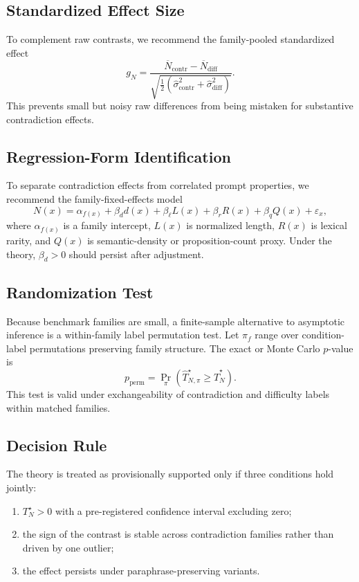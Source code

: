 \documentclass{svjour3}
\begin{document}
\subsection{Standardized Effect Size}
To complement raw contrasts, we recommend the family-pooled standardized effect
\[
g_N=\frac{\overline{N}_{\text{contr}}-\overline{N}_{\text{diff}}}
{\sqrt{\tfrac{1}{2}\left(\widehat{\sigma}_{\text{contr}}^2+\widehat{\sigma}_{\text{diff}}^2\right)}}.
\]
This prevents small but noisy raw differences from being mistaken for substantive contradiction effects.

\subsection{Regression-Form Identification}
To separate contradiction effects from correlated prompt properties, we recommend the family-fixed-effects model
\[
N(x)=\alpha_{f(x)}+\beta_d d(x)+\beta_\ell L(x)+\beta_r R(x)+\beta_q Q(x)+\varepsilon_x,
\]
where $\alpha_{f(x)}$ is a family intercept, $L(x)$ is normalized length, $R(x)$ is lexical rarity, and $Q(x)$ is semantic-density or proposition-count proxy. Under the theory, $\beta_d>0$ should persist after adjustment.

\subsection{Randomization Test}
Because benchmark families are small, a finite-sample alternative to asymptotic inference is a within-family label permutation test. Let $\pi_f$ range over condition-label permutations preserving family structure. The exact or Monte Carlo $p$-value is
\[
p_{\mathrm{perm}}=\Pr_{\pi}\!\left(\widehat{T}_{N,\pi}^{\star}\ge \widehat{T}_{N}^{\star}\right).
\]
This test is valid under exchangeability of contradiction and difficulty labels within matched families.

\subsection{Decision Rule}
The theory is treated as provisionally supported only if three conditions hold jointly:
\begin{enumerate}[leftmargin=*]
\item $T_N^{\star}>0$ with a pre-registered confidence interval excluding zero;
\item the sign of the contrast is stable across contradiction families rather than driven by one outlier;
\item the effect persists under paraphrase-preserving variants.
\end{enumerate}
\end{document}
